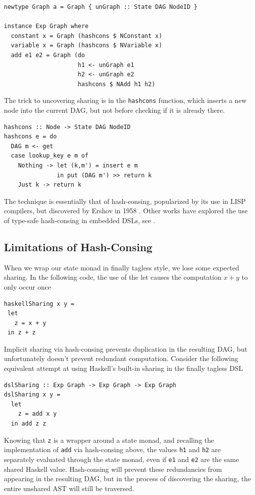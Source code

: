 \documentclass[runningheads]{llncs}
\begin{document}
\begin{verbatim}
newtype Graph a = Graph { unGraph :: State DAG NodeID }

instance Exp Graph where
  constant x = Graph (hashcons $ NConstant x)
  variable x = Graph (hashcons $ NVariable x)
  add e1 e2 = Graph (do
                     h1 <- unGraph e1
                     h2 <- unGraph e2
                     hashcons $ NAdd h1 h2)
\end{verbatim}

The trick to uncovering sharing is in the
\texttt{hashcons} function, which inserts a new node into the current DAG, but not
before checking if it is already there.
\begin{verbatim}
hashcons :: Node -> State DAG NodeID
hashcons e = do
  DAG m <- get
  case lookup_key e m of
    Nothing -> let (k,m') = insert e m
               in put (DAG m') >> return k
    Just k -> return k
\end{verbatim}

The technique is essentially that of hash-consing, popularized by its use in
LISP compilers, but discovered by Ershov in 1958 \cite{ershov1958:consing}.
Other works have explored the use of type-safe hash-consing in embedded DSLs,
see \cite{filliatre:typesafeconsing}.

\subsection{Limitations of Hash-Consing} \label{limithashcons}

When we wrap our state monad in finally tagless style, we lose some expected
sharing. In the following code, the use of the let causes the computation
$x + y$ to only occur once
\begin{verbatim}
haskellSharing x y =
 let
   z = x + y
 in z + z
\end{verbatim}

Implicit sharing via hash-consing prevents duplication in the resulting DAG, but
unfortunately doesn't prevent redundant computation. Consider the following
equivalent attempt at using Haskell's built-in sharing in the finally tagless DSL
\begin{verbatim}
dslSharing :: Exp Graph -> Exp Graph -> Exp Graph
dslSharing x y =
  let
    z = add x y
  in add z z
\end{verbatim}
Knowing that \texttt{z} is a wrapper around a state monad,
and recalling the implementation of
\texttt{add} via hash-consing above, 
the values \texttt{h1} and \texttt{h2} are
separately evaluated through the state monad, even if \texttt{e1} and \texttt{e2} are the same shared Haskell value. 
Hash-consing will prevent these redundancies from appearing in
the resulting DAG, 
but in the process of discovering the sharing, the entire unshared AST will still be traversed.
\end{document}
